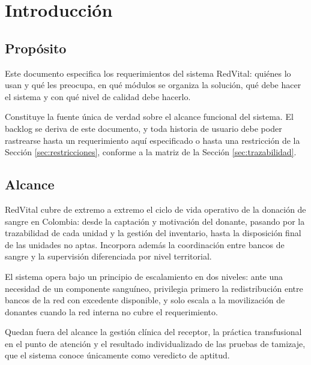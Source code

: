 \documentclass[11pt,a4paper]{article}
\begin{document}
\newpage

\tableofcontents
\newpage
\listoftables
\newpage

\section{Introducción}

\subsection{Propósito}

Este documento especifica los requerimientos del sistema RedVital: quiénes lo usan y qué les preocupa, en qué módulos se organiza la solución, qué debe hacer el sistema y con qué nivel de calidad debe hacerlo.

Constituye la fuente única de verdad sobre el alcance funcional del sistema. El backlog se deriva de este documento, y toda historia de usuario debe poder rastrearse hasta un requerimiento aquí especificado o hasta una restricción de la Sección \ref{sec:restricciones}, conforme a la matriz de la Sección \ref{sec:trazabilidad}.

\subsection{Alcance}

RedVital cubre de extremo a extremo el ciclo de vida operativo de la donación de sangre en Colombia: desde la captación y motivación del donante, pasando por la trazabilidad de cada unidad y la gestión del inventario, hasta la disposición final de las unidades no aptas. Incorpora además la coordinación entre bancos de sangre y la supervisión diferenciada por nivel territorial.

El sistema opera bajo un principio de escalamiento en dos niveles: ante una necesidad de un componente sanguíneo, privilegia primero la redistribución entre bancos de la red con excedente disponible, y solo escala a la movilización de donantes cuando la red interna no cubre el requerimiento.

Quedan fuera del alcance la gestión clínica del receptor, la práctica transfusional en el punto de atención y el resultado individualizado de las pruebas de tamizaje, que el sistema conoce únicamente como veredicto de aptitud.
\end{document}
